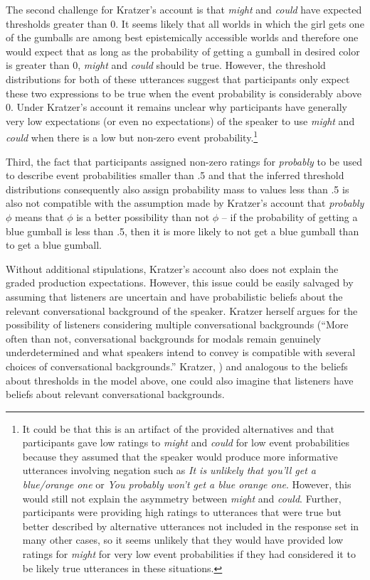 The second challenge for Kratzer's account is that \textit{might} and \textit{could} have expected thresholds greater than 0.
It seems likely that all worlds in which the girl gets one of the gumballs are among best epistemically accessible worlds 
and therefore one would expect that as long as the probability of getting a gumball in desired color is greater than 0, \textit{might} 
and \textit{could} should be true. However, the threshold distributions for both of these utterances suggest that participants only
expect these two expressions to be true when the event probability is considerably above 0. Under Kratzer's account it remains unclear
why participants have generally very low expectations (or even no expectations) of the speaker to use \textit{might} and \textit{could}
when there is a low but non-zero event probability.\footnote{It could be that this is an artifact of the provided alternatives and that participants gave
low ratings to \textit{might} and \textit{could} for low event probabilities because they assumed that the speaker would produce more informative utterances
involving negation such as \emph{It is unlikely that you'll get a blue/orange one} or \emph{You probably won't get a blue orange one}. However, this would still not explain
the asymmetry between \textit{might} and \textit{could}. Further, participants were providing high ratings to utterances that were true but better described by alternative utterances not included
in the response set in many other cases, so it seems unlikely that they would have provided low ratings for \textit{might} for very low event probabilities if they had considered 
it to be likely true utterances in these situations.}

Third, the fact that participants assigned non-zero ratings for \textit{probably} to be used to describe event probabilities smaller than .5 and that the
inferred threshold distributions consequently also assign probability mass to values less than .5 is also not compatible with the assumption made by 
Kratzer's account that \textit{probably} $\phi$ means that $\phi$ is a better possibility than not $\phi$ -- if the probability of getting a blue gumball is less than
.5, then it is more likely to not get a blue gumball than to get a blue gumball.

Without additional stipulations, Kratzer's account also does not explain the graded production expectations. However, this issue could be easily salvaged 
by assuming that listeners are uncertain and have probabilistic beliefs about the relevant conversational background of the speaker. Kratzer herself argues for the possibility
of listeners considering multiple conversational backgrounds (``More often than not, conversational backgrounds for modals remain genuinely underdetermined and what speakers intend to convey is compatible with several choices of conversational backgrounds.'' Kratzer, \citeyear[][Ch. 2, p. 32]{Kratzer2012}) and analogous to the beliefs about thresholds in the model above, one could also imagine that listeners have
beliefs about relevant conversational backgrounds.

